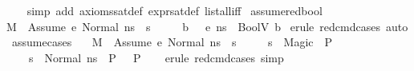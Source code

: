 \begin{isabellebody}
%
\isadelimproof
\ \ %
\endisadelimproof
%
\isatagproof
{}\isamarkupfalse%
\ {\isacharparenleft}{\kern0pt}simp\ add{\isacharcolon}{\kern0pt}\ axioms{\isacharunderscore}{\kern0pt}sat{\isacharunderscore}{\kern0pt}def\ expr{\isacharunderscore}{\kern0pt}sat{\isacharunderscore}{\kern0pt}def\ list{\isacharunderscore}{\kern0pt}all{\isacharunderscore}{\kern0pt}iff{\isacharparenright}{\kern0pt}%
\endisatagproof
{\isafoldproof}%
%
\isadelimproof
\isanewline
%
\endisadelimproof
\isanewline
{}\isamarkupfalse%
\ assume{\isacharunderscore}{\kern0pt}red{\isacharunderscore}{\kern0pt}bool{\isacharcolon}{\kern0pt}\isanewline
{\isachardoublequoteopen}M{\isacharcomma}{\kern0pt}{\isasymLambda}{\isacharcomma}{\kern0pt}{\isasymGamma}{\isacharcomma}{\kern0pt}{\isasymDelta}\ {\isasymturnstile}\ {\isasymlangle}Assume\ e{\isacharcomma}{\kern0pt}\ Normal\ n{\isacharunderscore}{\kern0pt}s{\isasymrangle}\ {\isasymrightarrow}\ s\ {\isasymLongrightarrow}\isanewline
\ \ \ \ {\isasymexists}b{\isachardot}{\kern0pt}\ {\isasymLambda}{\isacharcomma}{\kern0pt}{\isasymGamma}{\isacharcomma}{\kern0pt}{\isasymDelta}\ {\isasymturnstile}\ {\isasymlangle}e{\isacharcomma}{\kern0pt}\ n{\isacharunderscore}{\kern0pt}s{\isasymrangle}\ {\isasymDown}\ BoolV\ b{\isachardoublequoteclose}\isanewline
%
\isadelimproof
%
\endisadelimproof
%
\isatagproof
{}\isamarkupfalse%
\ {\isacharparenleft}{\kern0pt}erule\ red{\isacharunderscore}{\kern0pt}cmd{\isachardot}{\kern0pt}cases{\isacharparenright}{\kern0pt}\ auto%
\endisatagproof
{\isafoldproof}%
%
\isadelimproof
\isanewline
%
\endisadelimproof
\isanewline
{}\isamarkupfalse%
\ assume{\isacharunderscore}{\kern0pt}cases{\isacharunderscore}{\kern0pt}{}{\isacharcolon}{\kern0pt}\ \isanewline
\ \ {\isachardoublequoteopen}{\isasymlbrakk}M{\isacharcomma}{\kern0pt}{\isasymLambda}{\isacharcomma}{\kern0pt}{\isasymGamma}{\isacharcomma}{\kern0pt}{\isasymDelta}\ {\isasymturnstile}\ {\isasymlangle}Assume\ e{\isacharcomma}{\kern0pt}\ Normal\ n{\isacharunderscore}{\kern0pt}s{\isasymrangle}\ {\isasymrightarrow}\ s{\isacharsemicolon}{\kern0pt}\ \isanewline
\ \ \ \ s\ {\isacharequal}{\kern0pt}\ Magic\ {\isasymLongrightarrow}\ P{\isacharsemicolon}{\kern0pt}\ \isanewline
\ \ \ \ s\ {\isacharequal}{\kern0pt}\ Normal\ n{\isacharunderscore}{\kern0pt}s\ {\isasymLongrightarrow}\ P\ {\isasymrbrakk}\ {\isasymLongrightarrow}\ P{\isachardoublequoteclose}\isanewline
%
\isadelimproof
\ \ %
\endisadelimproof
%
\isatagproof
{}\isamarkupfalse%
\ {\isacharparenleft}{\kern0pt}erule\ red{\isacharunderscore}{\kern0pt}cmd{\isachardot}{\kern0pt}cases{\isacharsemicolon}{\kern0pt}\ simp{\isacharparenright}{\kern0pt}%

\end{isabellebody}
